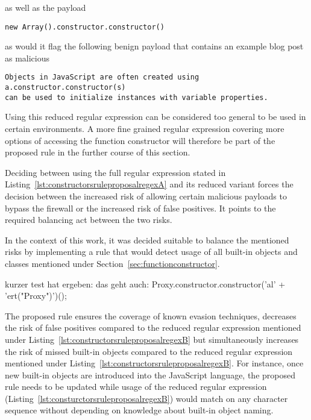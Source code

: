 as well as the payload

\begin{lstlisting}[style=basicStyle]
new Array().constructor.constructor()
\end{lstlisting}

as would it flag the following benign payload that contains an example blog post as malicious
\begin{lstlisting}[style=basicStyle]
Objects in JavaScript are often created using
a.constructor.constructor(s)
can be used to initialize instances with variable properties.
\end{lstlisting}
Using this reduced regular expression can be considered too general to be used in certain environments. A more fine grained regular expression covering more options of accessing the function constructor will therefore be part of the proposed rule in the further course of this section.

Deciding between using the full regular expression stated in Listing~\ref{lst:constructorsruleproposalregexA} and its reduced variant forces the decision between the increased risk of allowing certain malicious payloads to bypass the firewall or the increased risk of false positives. It points to the required balancing act between the two risks.

In the context of this work, it was decided suitable to balance the mentioned risks by implementing a rule that would detect usage of all built-in objects and classes mentioned under Section~\ref{sec:functionconstructor}. 


	{\color{blue}kurzer test hat ergeben: das geht auch: Proxy.constructor.constructor('al' + 'ert("Proxy")')(); }



The proposed rule ensures the coverage of known evasion techniques, decreases the risk of false positives compared to the reduced regular expression mentioned under Listing~\ref{lst:constructorsruleproposalregexB} but simultaneously increases the risk of missed built-in objects compared to the reduced regular expression mentioned under Listing~\ref{lst:constructorsruleproposalregexB}. For instance, once new built-in objects are introduced into the JavaScript language, the proposed rule needs to be updated while usage of the reduced regular expression (Listing~\ref{lst:consturctorsruleproposalregexB}) would match on any character sequence without depending on knowledge about built-in object naming.  





